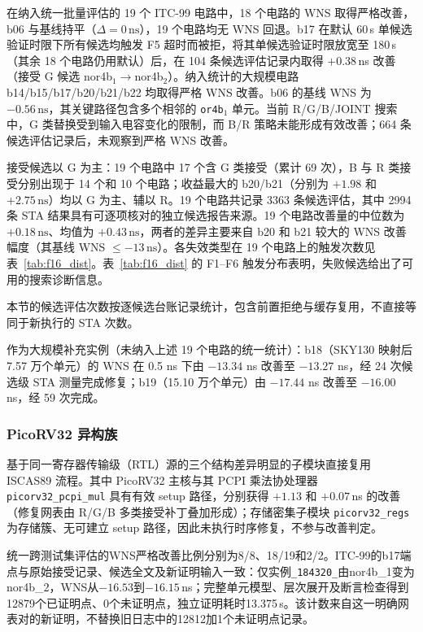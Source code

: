 \documentclass[twocolumn,10pt,fontset=windows]{ctexart}
\begin{document}
在纳入统一批量评估的 19 个 ITC-99 电路中，18 个电路的 WNS 取得严格改善，b06 与基线持平（$\Delta = 0\,\text{ns}$），19 个电路均无 WNS 回退。b17 在默认 60\,s 单候选验证时限下所有候选均触发 F5 超时而被拒，将其单候选验证时限放宽至 180\,s（其余 18 个电路仍用默认）后，在 104 条候选评估记录内取得 $+0.38\,$ns 改善（接受 G 候选 nor4b$_1\!\to\!$nor4b$_2$）。纳入统计的大规模电路 b14/b15/b17/b20/b21/b22 均取得严格 WNS 改善。b06 的基线 WNS 为 $-0.56\,\text{ns}$，其关键路径包含多个相邻的 \texttt{or4b$_1$} 单元。当前 R/G/B/JOINT 搜索中，G 类替换受到输入电容变化的限制，而 B/R 策略未能形成有效改善；664 条候选评估记录后，未观察到严格 WNS 改善。

接受候选以 G 为主：19 个电路中 17 个含 G 类接受（累计 69 次），B 与 R 类接受分别出现于 14 个和 10 个电路；收益最大的 b20/b21（分别为 $+1.98$ 和 $+2.75\,\text{ns}$）均以 G 为主、辅以 R。19 个电路共记录 3363 条候选评估，其中 2994 条 STA 结果具有可逐项核对的独立候选报告来源。19 个电路改善量的中位数为 $+0.18\,\text{ns}$、均值为 $+0.43\,\text{ns}$，两者的差异主要来自 b20 和 b21 较大的 WNS 改善幅度（其基线 WNS $\le -13\,\text{ns}$）。各失效类型在 19 个电路上的触发次数见表~\ref{tab:f16_dist}。表~\ref{tab:f16_dist} 的 F1--F6 触发分布表明，失败候选给出了可用的搜索诊断信息。

本节的候选评估次数按逐候选台账记录统计，包含前置拒绝与缓存复用，不直接等同于新执行的 STA 次数。

作为大规模补充实例（未纳入上述 19 个电路的统一统计）：b18（SKY130 映射后 7.57 万个单元）的 WNS 在 0.5 ns 下由 $-13.34$ ns 改善至 $-13.27$ ns，经 24 次候选级 STA 测量完成修复；b19（15.10 万个单元）由 $-17.44$ ns 改善至 $-16.00$ ns，经 59 次完成。

\subsubsection{PicoRV32 异构族}

基于同一寄存器传输级（RTL）源的三个结构差异明显的子模块直接复用 ISCAS89 流程。其中 PicoRV32 主核与其 PCPI 乘法协处理器 \texttt{picorv32\_pcpi\_mul} 具有有效 setup 路径，分别获得 $+1.13$ 和 $+0.07\,$ns 的改善（修复网表由 R/G/B 多类接受补丁叠加形成）；存储密集子模块 \texttt{picorv32\_regs} 为存储簇、无可建立 setup 路径，因此未执行时序修复，不参与改善判定。

统一跨测试集评估的WNS严格改善比例分别为8/8、18/19和2/2。ITC-99的b17端点与原始接受记录、候选全文及新证明输入一致：仅实例\texttt{\_184320\_}由nor4b\_1变为nor4b\_2，WNS从$-16.53$到$-16.15$\,ns；完整单元模型、层次展开及断言检查得到12879个已证明点、0个未证明点，独立证明耗时13.375\,s。该计数来自这一明确网表对的新证明，不替换旧日志中的12812加1个未证明点记录。
\end{document}
